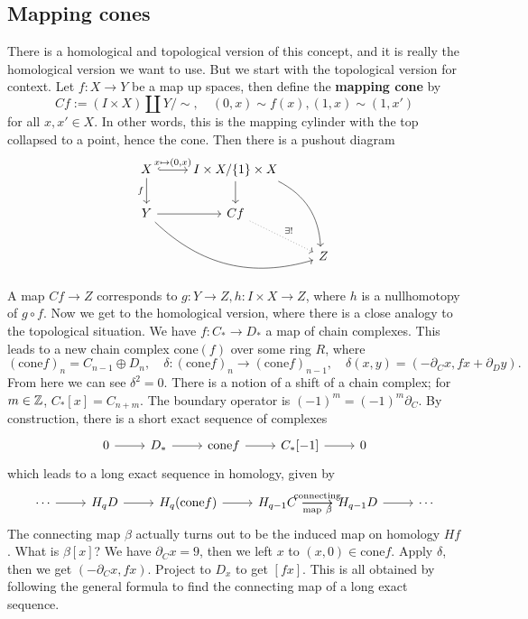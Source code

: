 \subsection{Mapping cones}
There is a homological and topological version of this concept, and it is really the homological version we want to use. But we start with the topological version for context. Let $f \colon X \to Y$ be a map up spaces, then define the \textbf{mapping cone} by \[
    Cf:= (I \times X) \amalg Y / \sim, \quad (0,x)\sim f(x), (1,x)\sim(1,x')
\] for all $x,x' \in X$. In other words, this is the mapping cylinder with the top collapsed to a point, hence the cone. Then there is a pushout diagram \[
\begin{tikzcd}
X \arrow[r, "{x\mapsto (0,x)}", hook] \arrow[d, "f"'] & I\times X / \{1\} \times X \arrow[d] \arrow[rdd, bend left] &   \\
Y \arrow[r] \arrow[rrd, bend right]                   & Cf \arrow[rd, "\exists!", dotted]                           &   \\
                                                      &                                                             & Z
\end{tikzcd}
\]  A map $Cf\to Z$ corresponds to $g \colon Y \to Z, h \colon I \times X \to Z$, where $h$ is a nullhomotopy of $g \circ f$. Now we get to the homological version, where there is a close analogy to the topological situation. We have $f \colon C_* \to D_*$ a map of chain complexes. This leads to a new chain complex $\mathrm{cone}(f)$ over some ring $R$, where \[
(\mathrm{cone}f)_n = C_{n-1}\oplus D_n ,\quad \delta \colon (\mathrm{cone}f)_n  \to (\mathrm{cone}f)_{n-1}, \quad \delta(x,y)=(-\partial _C x, fx+\partial _D y).
\] From here we can see $\delta^2=0$. There is a notion of a shift of a chain complex; for $m \in \mathbb{Z}$,  $C_*[x]=C_{n+m}$. The boundary operator is $(-1)^m=(-1)^m \partial _C$. By construction, there is a short exact sequence of complexes \[
\begin{tikzcd}
0 \arrow[r] & D_* \arrow[r] & \mathrm{cone}f \arrow[r] & {C_*[-1]} \arrow[r] & 0
\end{tikzcd}
\] which leads to a long exact sequence in homology, given by \[
\begin{tikzcd}
\cdots \arrow[r] & H_qD \arrow[r] & H_q(\mathrm{cone}f) \arrow[r] & H_{q-1}C \arrow[r, "\text{connecting}"] \arrow[r, "\text{map}\ \beta "'] & H_{q-1}D \arrow[r] & \cdots
\end{tikzcd}
\] The connecting map $\beta $ actually turns out to be the induced map on homology $Hf$. What is $\beta [x]$? We have $\partial _Cx=9$, then we left $x$ to $(x,0) \in \mathrm{cone}f$. Apply $\delta$, then we get $(-\partial _Cx,fx)$. Project to $D_x$ to get $[fx]$. This is all obtained by following the general formula to find the connecting map of a long exact sequence.

